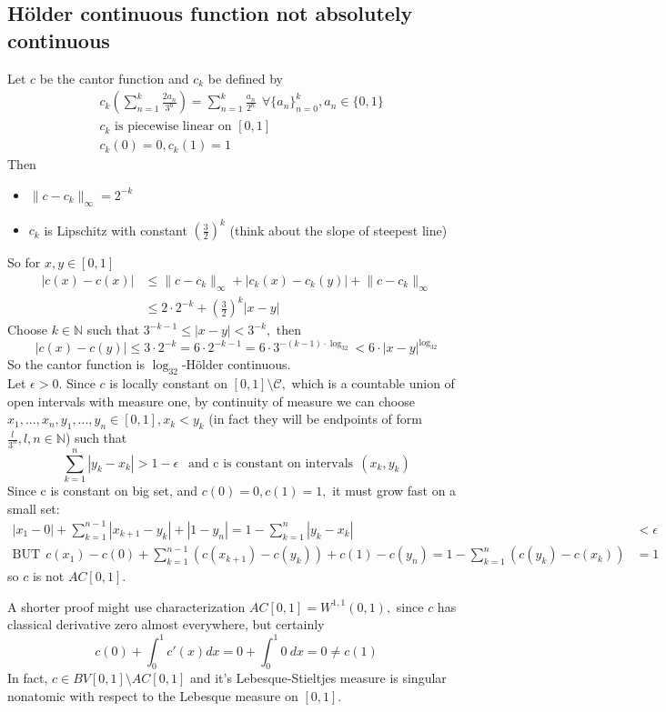\documentclass[12pt,a4paper]{article}
\newcommand\nm[1]{\lVert #1 \rVert}
\renewcommand\:{\colon}
\begin{document}
\subsection{Hölder continuous function not absolutely continuous}
Let $c$ be the cantor function and $c_k$ be defined by
\begin{align*}
	&c_k\left(\sum_{n=1}^k \frac{2a_n}{3^n}\right)=\sum_{n=1}^k \frac{a_n}{2^n} \ \ \forall \{a_n\}_{n=0}^k, a_n\in \{0,1\} \\
	&c_k \text{ is piecewise linear on } [0,1] \\
	&c_k(0)=0, c_k(1)=1
\end{align*}
Then 
\begin{itemize}
	\item $\nm{c-c_k}_{\infty} = 2^{-k}$
	\item $c_k$ is Lipschitz with constant $\displaystyle\left(\frac{3}{2}\right)^k$ (think about the slope of steepest line)
\end{itemize}
So for $x,y \in [0,1]$
\begin{align*}
	|c(x)-c(x)|&\leq \nm{c-c_k}_{\infty} + |c_k(x)-c_k(y)| + \nm{c-c_k}_{\infty}  \\
			   &\leq 2\cdot 2^{-k} + \left(\frac{3}{2}\right)^k|x-y|
\end{align*}
Choose $k\in \mathbb{N}$ such that $3^{-k-1}\leq |x-y| < 3^{-k},$ then
\begin{equation*}
	|c(x)-c(y)|\leq 3\cdot 2^{-k} = 6\cdot 2^{-k-1} = 6\cdot 3^{-(k-1)\cdot \log_32} < 6\cdot |x-y|^{\log_32}
\end{equation*}
So the cantor function is $\log_32$-Hölder continuous. \\
Let $\epsilon>0$. Since $c$ is locally constant on $[0,1]\setminus \mathcal{C},$ which is a countable union of open intervals with measure one, by continuity of measure we can choose $x_1, ..., x_n, y_1, ..., y_n\in [0,1], x_k<y_k$ (in fact they will be endpoints of form $\frac{l}{3^n}, l,n\in \mathbb{N}$) such that
\begin{equation*}
	\sum_{k=1}^n |y_k-x_k| > 1-\epsilon \ \ \text{ and c is constant on intervals} \ \ (x_k,y_k)  
\end{equation*}
Since c is constant on big set, and $c(0)=0, c(1)=1,$ it must grow fast on a small set:
\begin{align*}
	|x_1-0| + \sum_{k=1}^{n-1} |x_{k+1}-y_{k}| + |1-y_n| = 1-\sum_{k=1}^n |y_k-x_k| &< \epsilon \\
	\text{BUT} \ \ c(x_1)-c(0) + \sum_{k=1}^{n-1}(c(x_{k+1})-c(y_k))+c(1)-c(y_n) = 1-\sum_{k=1}^n(c(y_k)-c(x_k))&=1 
\end{align*}
so $c$ is not $AC[0,1].$ 
\par A shorter proof might use characterization $AC[0,1]=W^{1,1}(0,1),$ since $c$ has classical derivative zero almost everywhere, but certainly
\begin{equation*}
	c(0)+\int_{0}^1 c'(x)dx = 0+\int_{0}^1 0\ dx = 0 \neq c(1)
\end{equation*}
In fact, $c\in BV[0,1]\setminus AC[0,1]$ and it's Lebesque-Stieltjes measure is singular nonatomic with respect to the Lebesque measure on $[0,1].$ 
\end{document}
